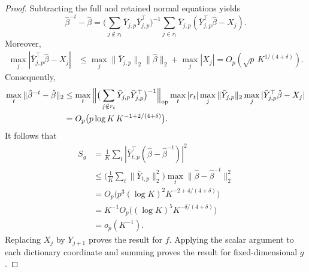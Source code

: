 \documentclass[12pt]{article}
\numberwithin{equation}{section}
\begin{document}
\begin{proof}
Subtracting the full and retained normal equations yields
\[
\hat\beta^{-t}-\hat\beta
=
\big(
\sum_{j\notin r_t}
\bar Y_{j,p}\bar Y_{j,p}^\top
\big)^{-1}
\sum_{j\in r_t}
\bar Y_{j,p}
(\bar Y_{j,p}^\top\hat\beta-X_j).
\]
Moreover,
\begin{align*}
\max_j|\bar Y_{j,p}^\top\hat\beta-X_j|
&\leq
\max_j\|\bar Y_{j,p}\|_2\|\hat\beta\|_2
+\max_j|X_j|=
O_p(\sqrt p\,K^{1/(4+\delta)}).
\end{align*}
Consequently,
\begin{align}
\max_t\|\hat\beta^{-t}-\hat\beta\|_2
&\leq
\max_t
\Big\|
\big(
\sum_{j\notin r_t}
\bar Y_{j,p}\bar Y_{j,p}^\top
\big)^{-1}
\Big\|_{\mathrm{op}}
\max_t|r_t|
\max_j\|\bar Y_{j,p}\|_2
\max_j|\bar Y_{j,p}^\top\hat\beta-X_j|
\notag\\
&=
O_p\big(
p\log K\,K^{-1+2/(4+\delta)}
\big).
\label{eq:linear-coefficient-stability}
\end{align}
It follows that
\begin{align*}
S_g
&=
\frac1K\sum_t
|\bar Y_{t,p}^\top(\hat\beta-\hat\beta^{-t})|^2\\
&\leq
\big(
\frac1K\sum_t\|\bar Y_{t,p}\|_2^2
\big)
\max_t\|\hat\beta-\hat\beta^{-t}\|_2^2\\
&=
O_p\big(
p^3(\log K)^2K^{-2+4/(4+\delta)}
\big)\\
&=
K^{-1}O_p\big(
(\log K)^5K^{-\delta/(4+\delta)}
\big)\\
&=o_p(K^{-1}).
\end{align*}
Replacing $X_j$ by $Y_{j+1}$ proves the result for $f$.
Applying the scalar argument to each dictionary coordinate and
summing proves the result for fixed-dimensional $g$.
\end{proof}
\end{document}

